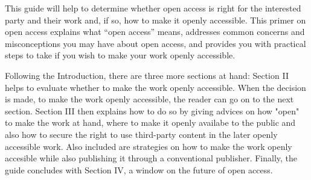 \documentclass{article}
\begin{document}
This guide will help to determine whether open access is right for the interested party and their work and, if so, how to make it openly accessible. This primer on open access explains what “open access” means, addresses common concerns and misconceptions you may have about open access, and provides you with practical steps to take if you wish to make your work openly accessible.


Following the Introduction, there are three more sections at hand: Section II helps to evaluate whether to make the work openly accessible. When the decision is made, to make the work openly accessible, the reader can go on to the next section. Section III then explains how to do so by giving advices on how "open" to make the work at hand, where to make it openly availabe to the public and also how to secure the right to use third-party content in the later openly accessible work. Also included are strategies on how to make the work openly accesible while also publishing it through a conventional publisher.  Finally, the guide concludes with Section IV, a window on the future of open access.





\printbibliography[title={Literaturverzeichnis}]
\end{document}
